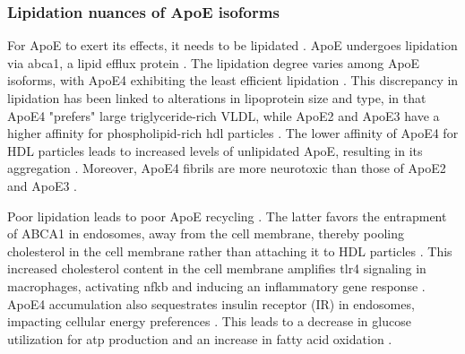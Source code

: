 \documentclass{amsart}
\theoremstyle{plain}
\begin{document}
\subsubsection{Lipidation nuances of ApoE isoforms}
For ApoE to exert its effects, it needs to be lipidated \cite{Husain2021APOETherapeutics}. ApoE undergoes lipidation via \acrfull{abca1}, a lipid efflux protein \cite{Flowers2020APOEBrain, Courtney2016LXRDisease}. The lipidation degree varies among ApoE isoforms, with ApoE4 exhibiting the least efficient lipidation \cite{Hu2015OpposingMice, Heinsinger2016ApolipoproteinFluid}. This discrepancy in lipidation has been linked to alterations in lipoprotein size and type, in that ApoE4 "prefers" large triglyceride-rich VLDL, while ApoE2 and ApoE3 have a higher affinity for phospholipid-rich \acrshort{hdl} particles \cite{Nguyen2010MolecularE4}. The lower affinity of ApoE4 for HDL particles leads to increased levels of unlipidated ApoE, resulting in its aggregation \cite{Hatters2006ApolipoproteinFunction}. Moreover, ApoE4 fibrils are more neurotoxic than those of ApoE2 and ApoE3 \cite{Hatters2006Amino-terminalFibrils}.

Poor lipidation leads to poor ApoE recycling \cite{Yassine2020APOEDisease}. The latter favors the entrapment of ABCA1 in endosomes, away from the cell membrane, thereby pooling cholesterol in the cell membrane rather than attaching it to HDL particles \cite{Rawat2019ApoE4Astrocytes}. This increased cholesterol content in the cell membrane amplifies \acrfull{tlr4} signaling in macrophages, activating \acrshort{nfkb} and inducing an inflammatory gene response \cite{Yassine2020APOEDisease}.  ApoE4 accumulation also sequestrates insulin receptor (IR) in endosomes, impacting cellular energy preferences \cite{Zhao2017ApolipoproteinEndosomes}. This leads to a decrease in glucose utilization for \acrshort{atp} production and an increase in fatty acid oxidation \cite{Svennerholm1997ChangesSwedes}. 
\end{document}
